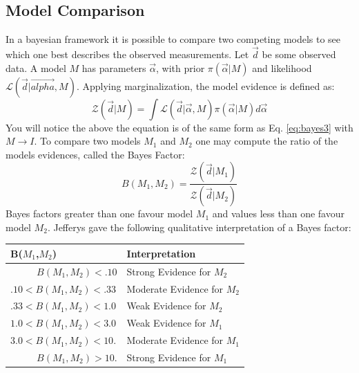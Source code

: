 \documentclass[12pt]{article}
\numberwithin{equation}{section}
\begin{document}
\subsection{Model Comparison}
In a bayesian framework it is possible to compare two competing models to see which one best describes the observed measurements.
Let $\vec{d}$ be some observed data. A model $M$ has parameters $\vec{\alpha}$, with prior $\pi(\vec{\alpha}|M)$ and likelihood $\mathcal{L}(\vec{d}|\vec{alpha},M)$. Applying marginalization, the model evidence is defined as:
\begin{equation} \label{eq:evidence}
	\mathcal{Z}(\vec{d}|M) = \int \mathcal{L}(\vec{d}|\vec{\alpha},M)\pi(\vec{\alpha}|M)d\vec{\alpha}
\end{equation}
You will notice the above the equation is of the same form as Eq. \ref{eq:bayes3} with $M \rightarrow I$. To compare two models $M_1$ and $M_2$ one may compute the ratio of the models evidences, called the Bayes Factor\cite{von2011bayesian}:
\begin{equation} \label{eq:bayesfactor}
	B(M_1,M_2) = \frac{\mathcal{Z}(\vec{d}|M_1)}{\mathcal{Z}(\vec{d}|M_2)} 
\end{equation}
Bayes factors greater than one favour model $M_1$ and values less than one favour model $M_2$. Jefferys\cite
{jeffreys1998theory} gave the following qualitative interpretation of a Bayes factor:
\begin{center}
	\begin{tabular}{l|l}
		\bf{B($M_1$,$M_2$)} & \bf{Interpretation} \\ 
		\hline
		${\qquad \;\;\, B(M_1,M_2) < .10}$ & Strong Evidence for $M_2$ \\
		${.10 < B(M_1,M_2) < .33}$ & Moderate Evidence for $M_2$ \\
		${.33 < B(M_1,M_2) < 1.0}$ & Weak Evidence for $M_2$ \\
		${1.0 < B(M_1,M_2) < 3.0}$ & Weak Evidence for $M_1$ \\
		${3.0 < B(M_1,M_2) < 10.}$ & Moderate Evidence for $M_1$ \\
		${\qquad \;\;\, B(M_1,M_2) > 10.}$ & Strong Evidence for $M_1$ \\
	\end{tabular}
	\label{tab:bayesfactor}
\end{center}
\end{document}
